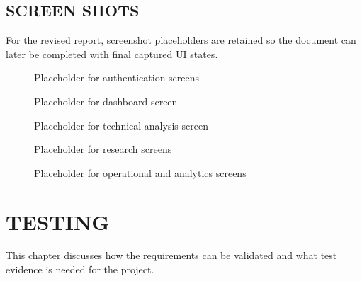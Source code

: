 \documentclass[12pt,a4paper]{report}
\begin{document}
\section{SCREEN SHOTS}
For the revised report, screenshot placeholders are retained so the document can later be completed with final captured UI states.

\begin{figure}[H]
\centering
{}
\caption{Placeholder for authentication screens}
\end{figure}

\begin{figure}[H]
\centering
{}
\caption{Placeholder for dashboard screen}
\end{figure}

\begin{figure}[H]
\centering
{}
\caption{Placeholder for technical analysis screen}
\end{figure}

\begin{figure}[H]
\centering
{}
\caption{Placeholder for research screens}
\end{figure}

\begin{figure}[H]
\centering
{}
\caption{Placeholder for operational and analytics screens}
\end{figure}

\chapter{TESTING}
This chapter discusses how the requirements can be validated and what test evidence is needed for the project.
\end{document}
